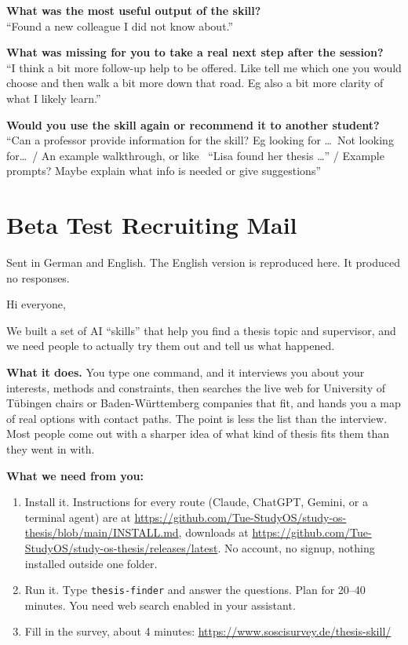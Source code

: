 \documentclass[11pt,a4paper]{article}
\begin{document}
\medskip
\noindent \textbf{What was the most useful output of the skill?}\\
``Found a new colleague I did not know about.''

\medskip
\noindent \textbf{What was missing for you to take a real next step after the
session?}\\
``I think a bit more follow-up help to be offered. Like tell me which one you
would choose and then walk a bit more down that road. Eg also a bit more clarity
of what I likely learn.''

\medskip
\noindent \textbf{Would you use the skill again or recommend it to another
student?}\\
``Can a professor provide information for the skill? Eg looking for \dots\ Not
looking for\dots\ / An example walkthrough, or like \, ``Lisa found her thesis
\dots'' / Example prompts? Maybe explain what info is needed or give
suggestions''

\section{Beta Test Recruiting Mail}
\label{app:beta-mail}

\noindent Sent in German and English. The English version is reproduced here. It
produced no responses.

\medskip
\noindent Hi everyone,

\medskip
\noindent We built a set of AI ``skills'' that help you find a thesis topic and
supervisor, and we need people to actually try them out and tell us what
happened.

\medskip
\noindent \textbf{What it does.} You type one command, and it interviews you about
your interests, methods and constraints, then searches the live web for
University of T\"ubingen chairs or Baden-W\"urttemberg companies that fit, and
hands you a map of real options with contact paths. The point is less the list
than the interview. Most people come out with a sharper idea of what kind of
thesis fits them than they went in with.

\medskip
\noindent \textbf{What we need from you:}

\begin{enumerate}[leftmargin=1.4em,itemsep=0.35em]
  \item Install it. Instructions for every route (Claude, ChatGPT, Gemini, or a
 terminal agent) are at \url{https://github.com/Tue-StudyOS/study-os-thesis/blob/main/INSTALL.md},
 downloads at \url{https://github.com/Tue-StudyOS/study-os-thesis/releases/latest}.
 No account, no signup, nothing installed outside one folder.
  \item Run it. Type \texttt{thesis-finder} and answer the questions. Plan for
 20--40 minutes. You need web search enabled in your assistant.
  \item Fill in the survey, about 4 minutes:
    \url{https://www.soscisurvey.de/thesis-skill/}
\end{enumerate}
\end{document}
